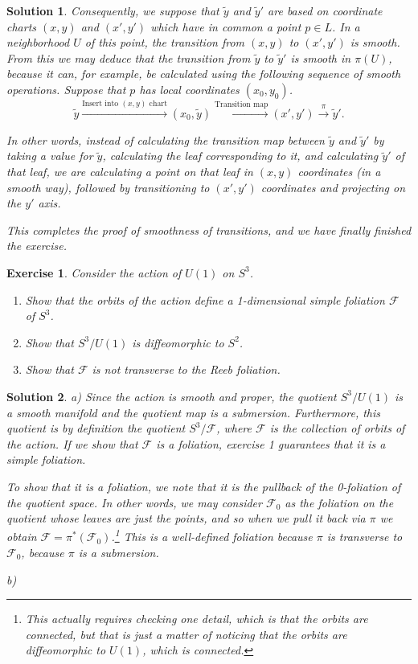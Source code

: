 \documentclass{article}
\newtheorem{ex}{Exercise}
\theoremstyle{nonumberplain}
\newtheorem{sol}{Solution}
\newcommand{\FF}{\mathcal{F}}
\begin{document}
\begin{sol}
Consequently, we suppose that $\tilde y$ and $\tilde y'$ are based on coordinate charts $(x,y)$ and $(x',y')$ which have in common a point $p \in L$. In a neighborhood $U$ of this point, the transition from $(x,y)$ to $(x',y')$ is smooth. From this we may deduce that the transition from $\tilde y$ to $\tilde y'$ is smooth in $\pi(U)$, because it can, for example, be calculated using the following sequence of smooth operations. Suppose that $p$ has local coordinates $(x_0,y_0)$.
\[\tilde y \xrightarrow{\text{Insert into $(x,y)$ chart}} (x_0,\tilde y) \xrightarrow{\text{Transition map}} (x', y') \xrightarrow{\pi} \tilde y'.\]

In other words, instead of calculating the transition map between $\tilde y$ and $\tilde y'$ by taking a value for $\tilde y$, calculating the leaf corresponding to it, and calculating $\tilde y'$ of that leaf, we are calculating a point on that leaf in $(x,y)$ coordinates (in a smooth way), followed by transitioning to $(x',y')$ coordinates and projecting on the $y'$ axis.

This completes the proof of smoothness of transitions, and we have finally finished the exercise.
\end{sol}

\begin{ex}
Consider the action of $U(1)$ on $S^3$.
\begin{enumerate}
\item Show that the orbits of the action define a 1-dimensional simple foliation $\FF$ of $S^3$.

\item Show that $S^3/U(1)$ is diffeomorphic to $S^2$.

\item Show that $\FF$ is not transverse to the Reeb foliation.
\end{enumerate}
\end{ex}

\begin{sol}
a) Since the action is smooth and proper, the quotient $S^3/U(1)$ is a smooth manifold and the quotient map is a submersion. Furthermore, this quotient is by definition the quotient $S^3/\FF$, where $\FF$ is the collection of orbits of the action. If we show that $\FF$ is a foliation, exercise 1 guarantees that it is a simple foliation.

To show that it is a foliation, we note that it is the pullback of the 0-foliation of the quotient space. In other words, we may consider $\FF_0$ as the foliation on the quotient whose leaves are just the points, and so when we pull it back via $\pi$ we obtain $\FF = \pi^*(\FF_0)$.\footnote{This actually requires checking one detail, which is that the orbits are connected, but that is just a matter of noticing that the orbits are diffeomorphic to $U(1)$, which is connected.} This is a well-defined foliation because $\pi$ is transverse to $\FF_0$, because $\pi$ is a submersion.

\medskip

b) 
\end{sol}
\end{document}

